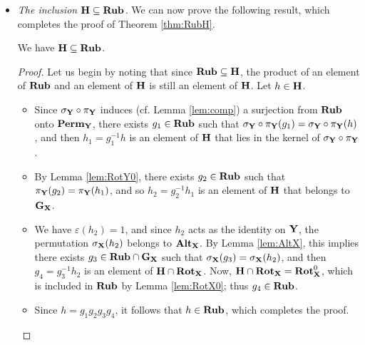 \begin{itemize}
    \item \emph{The inclusion $\mathbf{H} \subseteq \mathbf{Rub}$.}
    We can now prove the following result, which completes the proof of Theorem \ref{thm:RubH}.
    \begin{proposition}
        \label{prop:HSubRub}
        We have $\mathbf{H} \subseteq \mathbf{Rub}$.
    \end{proposition}
    \begin{proof}
        Let us begin by noting that since $\mathbf{Rub} \subseteq \mathbf{H}$, the product of an element of $\mathbf{Rub}$ and an element of $\mathbf{H}$ is still an element of $\mathbf{H}$. Let $h \in \mathbf{H}$.
        \begin{itemize}
            \item Since $\sigma_{\mathbf{Y}} \circ \pi_{\mathbf{Y}}$ induces (cf. Lemma \ref{lem:comp}) a surjection from $\mathbf{Rub}$ onto $\mathbf{Perm}_{\mathbf{Y}}$, there exists $g_{1} \in \mathbf{Rub}$ such that $\sigma_{\mathbf{Y}} \circ \pi_{\mathbf{Y}}(g_{1}) = \sigma_{\mathbf{Y}} \circ \pi_{\mathbf{Y}}(h)$, and then $h_{1} = g_{1}^{-1} h$ is an element of $\mathbf{H}$ that lies in the kernel of $\sigma_{\mathbf{Y}} \circ \pi_{\mathbf{Y}}$.
            \item By Lemma \ref{lem:RotY0}, there exists $g_{2} \in \mathbf{Rub}$ such that $\pi_{\mathbf{Y}}(g_{2}) = \pi_{\mathbf{Y}}(h_{1})$, and so $h_{2} = g_{2}^{-1} h_{1}$ is an element of $\mathbf{H}$ that belongs to $\mathbf{G}_{\mathbf{X}}$.
            \item We have $\varepsilon(h_{2}) = 1$, and since $h_{2}$ acts as the identity on $\mathbf{Y}$, the permutation $\sigma_{\mathbf{X}}(h_{2})$ belongs to $\mathbf{Alt}_{\mathbf{X}}$.
            By Lemma \ref{lem:AltX}, this implies there exists $g_{3} \in \mathbf{Rub} \cap \mathbf{G}_{\mathbf{X}}$ such that $\sigma_{\mathbf{X}}(g_{3}) = \sigma_{\mathbf{X}}(h_{2})$, and then $g_{4} = g_{3}^{-1} h_{2}$ is an element of $\mathbf{H} \cap \mathbf{Rot}_{\mathbf{X}}$.
            Now, $\mathbf{H} \cap \mathbf{Rot}_{\mathbf{X}} = \mathbf{Rot}_{\mathbf{X}}^{0}$, which is included in $\mathbf{Rub}$ by Lemma \ref{lem:RotX0}; thus $g_{4} \in \mathbf{Rub}$.
            \item Since $h = g_{1} g_{2} g_{3} g_{4}$, it follows that $h \in \mathbf{Rub}$, which completes the proof.
        \end{itemize}
    \end{proof}
\end{itemize}




